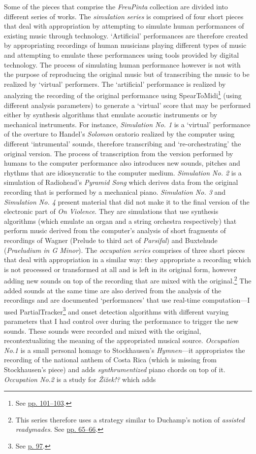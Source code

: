 Some of the pieces that comprise the \emph{FreuPinta} collection are divided into different series of works. The \emph{simulation series} is comprised of four short pieces that deal with appropriation by attempting to simulate human performances of existing music through technology. `Artificial' performances are therefore created by appropriating recordings of human musicians playing different types of music and attempting to emulate these performances using tools provided by digital technology. The process of simulating human performance however is not with the purpose of reproducing the original music but of transcribing the music to be realized by `virtual' performers. The `artificial' performance is realized by analyzing the recording of the original performance using SpearToMidi\footnote{See \hyperlink{spearmidi}{pp. 101--103}.} (using different analysis parameters) to generate a `virtual' score that may be performed either by synthesis algorithms that emulate acoustic instruments or by mechanical instruments. For instance, \emph{Simulation No. 1} is a `virtual' performance of the overture to Handel's \emph{Solomon} oratorio realized by the computer using different `intrumental' sounds, therefore transcribing and `re-orchestrating' the original version. The process of transcription from the version performed by humans to the computer performance also introduces new sounds, pitches and rhythms that are idiosyncratic to the computer medium. \emph{Simulation No. 2} is a simulation of Radiohead's \emph{Pyramid Song} which derives data from the original recording that is performed by a mechanical piano. \emph{Simulation No. 3} and \emph{Simulation No. 4} present material that did not make it to the final version of the electronic part of \emph{On Violence}. They are simulations that use synthesis algorithms (which emulate an organ and a string orchestra respectively) that perform music derived from the computer's analysis of short fragments of recordings of Wagner (Prelude to third act of \emph{Parsifal}) and Buxtehude (\emph{Praeludium in G Minor}). The \emph{occupation series} comprises of three short pieces that deal with appropriation in a similar way: they appropriate a recording which is not processed or transformed at all and is left in its original form, however adding new sounds on top of the recording that are mixed with the original.\footnote{This series therefore uses a strategy similar to Duchamp's notion of \emph{assisted readymades}. See \hyperlink{lhooq}{pp. 65--66}.} The added sounds at the same time are also derived from the analysis of the recordings and are documented `performances' that use real-time computation---I used PartialTracker\footnote{See \hyperlink{partrack}{p. 97}.} and onset detection algorithms with different varying parameters that I had control over during the performance to trigger the new sounds. These sounds were recorded and mixed with the original, recontextualizing the meaning of the appropriated musical source. \emph{Occupation No.1} is a small personal homage to Stockhausen's \emph{Hymnen}---it appropriates the recording of the national anthem of Costa Rica (which is missing from Stockhausen's piece) and adds \emph{synthrumentized} piano chords on top of it. \emph{Occupation No.2} is a study for \emph{\v{Z}i\v{z}ek!?} which adds 